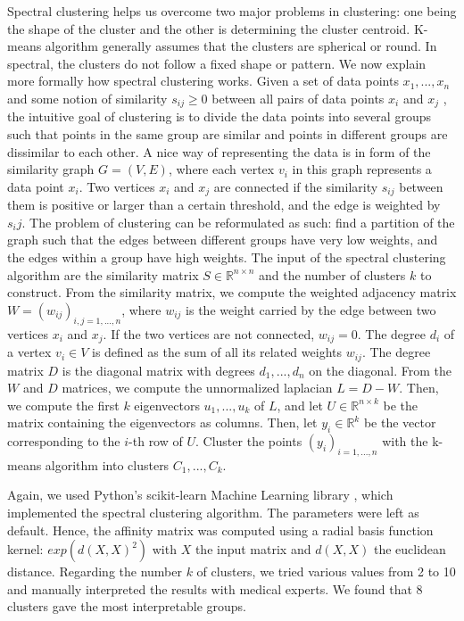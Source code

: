 Spectral clustering helps us overcome two major problems in clustering: one
being the shape of the cluster and the other is determining the cluster
centroid. K-means algorithm generally assumes that the clusters are spherical or
round. In spectral, the clusters do not follow a fixed shape or pattern. We now
explain more formally how spectral clustering works. Given a set of data points
$x_1, ..., x_n$ and some notion of similarity $s_{ij} \geq 0$ between all pairs
of data points $x_i$ and $x_j$ , the intuitive goal of clustering is to divide
the data points into several groups such that points in the same group are
similar and points in different groups are dissimilar to each other. A nice way
of representing the data is in form of the similarity graph $G = (V, E)$, where
each vertex $v_i$ in this graph represents a data point $x_i$. Two vertices
$x_i$ and $x_j$ are connected if the similarity $s_{ij}$ between them is
positive or larger than a certain threshold, and the edge is weighted by $s_ij$.
The problem of clustering can be reformulated as such: find a partition of the
graph such that the edges between different groups have very low weights, and
the edges within a group have high weights. The input of the spectral clustering
algorithm are the similarity matrix $S \in \mathbb{R}^{n \times n}$ and the
number of clusters $k$ to construct. From the similarity matrix, we compute the
weighted adjacency matrix $W = (w_{ij})_{i,j=1, ..., n}$, where $w_{ij}$ is the
weight carried by the edge between two vertices $x_i$ and $x_j$. If the two
vertices are not connected, $w_{ij}=0$. The degree $d_i$ of a vertex $v_i \in V$
is defined as the sum of all its related weights $w_{ij}$. The degree matrix $D$
is the diagonal matrix with degrees $d_1, ..., d_n$ on the diagonal. From
the $W$ and $D$ matrices, we compute the unnormalized laplacian $L=D-W$. Then,
we compute the first $k$ eigenvectors $u_1, ..., u_k$ of $L$, and let
$U \in \mathbb{R}^{n \times k}$ be the matrix containing the eigenvectors as
columns. Then, let $y_i \in \mathbb{R}^k$ be the vector corresponding to the
$i$-th row of $U$. Cluster the points $(y_i)_{i=1,...,n}$ with the k-means
algorithm into clusters $C_1, ..., C_k$.

Again, we used Python's scikit-learn Machine Learning library
\cite{pedregosa_scikit-learn_2011}, which implemented the spectral clustering
algorithm. The parameters were left as default. Hence, the affinity matrix was
computed using a radial basis function kernel: $exp(d(X, X)^2)$ with $X$ the
input matrix and $d(X, X)$ the euclidean distance. Regarding the number $k$ of
clusters, we tried various values from 2 to 10 and manually interpreted the
results with medical experts. We found that 8 clusters gave the most
interpretable groups.

